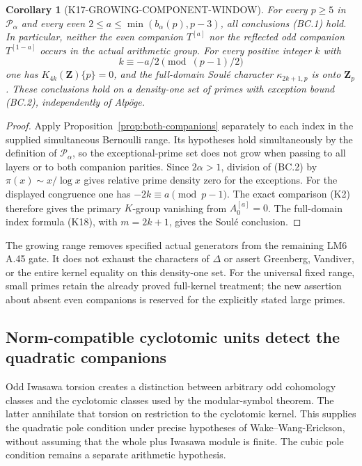 \documentclass[11pt,a4paper]{article}
\newtheorem{corollary}[theorem]{Corollary}
\theoremstyle{definition}
\begin{document}
\begin{corollary}[K17-GROWING-COMPONENT-WINDOW]
\label{cor:growing-component-window}
For every $p\geq5$ in $\mathcal P_\alpha$ and every even
$2\leq a\leq\min(b_\alpha(p),p-3)$, all conclusions (BC.1)
hold. In particular, neither the even companion $T^{[a]}$
nor the reflected odd companion $T^{[1-a]}$ occurs in the
actual arithmetic group. For every positive integer $k$ with
\[
                     k\equiv-a/2\pmod{(p-1)/2}
\]
one has $K_{4k}(\mathbf Z)\{p\}=0$, and the full-domain
Soul\'e character $\kappa_{2k+1,p}$ is onto $\mathbf Z_p$.
These conclusions hold on a density-one set of primes with
exception bound (BC.2), independently of Alp\"oge.
\end{corollary}

\begin{proof}
Apply Proposition~\ref{prop:both-companions} separately to each
index in the supplied simultaneous Bernoulli range. Its hypotheses
hold simultaneously by the definition of $\mathcal P_\alpha$,
so the exceptional-prime set does not grow when passing to all
layers or to both companion parities. Since $2\alpha>1$,
division of (BC.2) by $\pi(x)\sim x/\log x$ gives relative
prime density zero for the exceptions.
For the displayed congruence one has $-2k\equiv a\pmod{p-1}$.
The exact comparison (K2) therefore gives the primary $K$-group
vanishing from $A_0^{[a]}=0$. The full-domain index formula
(K18), with $m=2k+1$, gives the Soul\'e conclusion.
\end{proof}

The growing range removes specified actual generators from the
remaining LM6 A.45 gate. It does not exhaust the characters of
$\Delta$ or assert Greenberg, Vandiver, or the entire kernel
equality on this density-one set. For the universal fixed range,
small primes retain the already proved full-kernel treatment;
the new assertion about absent even companions is reserved for
the explicitly stated large primes.

\subsection{Norm-compatible cyclotomic units detect the quadratic companions}
\label{sec:universal-cyclotomic-pair}

Odd Iwasawa torsion creates a distinction between arbitrary odd
cohomology classes and the cyclotomic classes used by the modular-symbol
theorem.  The latter annihilate that torsion on restriction to the
cyclotomic kernel.  This supplies the quadratic pole condition under
precise hypotheses of Wake--Wang-Erickson, without assuming that the
whole plus Iwasawa module is finite.  The cubic pole condition remains
a separate arithmetic hypothesis.
\end{document}
